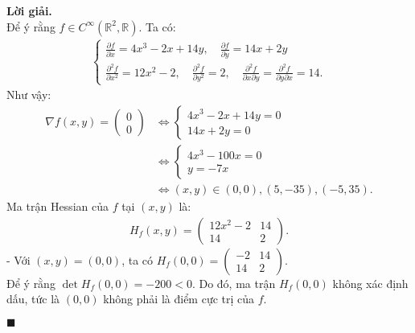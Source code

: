 \documentclass[12pt]{article}
\newcommand{\R}{\mathbb{R}}
\newenvironment{solution}{%
     \setlength\parindent{0pt}\par\medskip\textbf{Lời giải.}\quad}{%
     \hfill\tiny$\blacksquare$\par\medskip}
\begin{document}
    \begin{solution}
        \\
        Để ý rằng $f \in C^{\infty}(\R^2, \R)$. Ta có:
        \begin{align*}
            \begin{cases}
                \frac{\partial f}{\partial x} = 4x^3 - 2x + 14y, \quad \frac{\partial f}{\partial y} = 14x + 2y\\
                \frac{\partial^2 f}{\partial x^2} = 12x^2 - 2, \quad \frac{\partial^2 f}{\partial y^2} = 2, \quad \frac{\partial^2 f}{\partial x \partial y} = \frac{\partial^2 f}{\partial y \partial x} = 14.
            \end{cases}
        \end{align*}
        Như vậy:
        \begin{align*}
            \nabla f(x, y) = \begin{pmatrix}
                0\\
                0
            \end{pmatrix} &\Leftrightarrow \begin{cases}
                4x^3 - 2x + 14y = 0\\
                14x + 2y = 0
            \end{cases}\\
            &\Leftrightarrow \begin{cases}
                4x^3 - 100x = 0\\
                y = -7x
            \end{cases}\\
            & \Leftrightarrow (x,y) \in {(0, 0), (5, -35), (-5, 35)}.
        \end{align*}
        Ma trận Hessian của $f$ tại $(x, y)$ là:
        \begin{align*}
            H_f(x, y) = \begin{pmatrix}
                12x^2 - 2 & 14\\
                14 & 2
            \end{pmatrix}.
        \end{align*}
        - Với $(x, y) = (0, 0)$, ta có $H_f(0, 0) = \begin{pmatrix}
            -2 & 14\\
            14 & 2
        \end{pmatrix}$.
        \\
        Để ý rằng $\det{H_f(0, 0)} = -200 < 0$. Do đó, ma trận $H_f(0, 0)$ không xác định dấu, tức là $(0, 0)$ không phải là điểm cực trị của $f$.

\end{solution}
\end{document}

